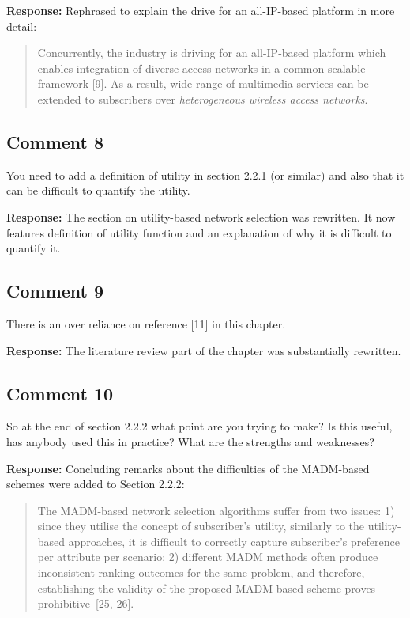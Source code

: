 \documentclass[10pt,a4paper,notitlepage]{article}
\numberwithin{equation}{section}
\begin{document}
\textbf{Response:}
Rephrased to explain the drive for an all-IP-based platform in more detail:
\begin{quote}
Concurrently, the industry is driving for an all-IP-based platform which enables integration of diverse access networks in a common scalable framework [9]. As a result, wide range of multimedia services can be extended to subscribers over \emph{heterogeneous wireless access networks}.
\end{quote}

\subsection{Comment 8}
You need to add a definition of utility in section 2.2.1 (or similar) and also that it can be difficult to quantify the utility.

\textbf{Response:}
The section on utility-based network selection was rewritten. It now features definition of utility function and an explanation of why it is difficult to quantify it.

\subsection{Comment 9}
There is an over reliance on reference [11] in this chapter.

\textbf{Response:}
The literature review part of the chapter was substantially rewritten.

\subsection{Comment 10}
So at the end of section 2.2.2 what point are you trying to make? Is this useful, has anybody used this in practice? What are the strengths and weaknesses?

\textbf{Response:}
Concluding remarks about the difficulties of the MADM-based schemes were added to Section 2.2.2:
\begin{quote}
The MADM-based network selection algorithms suffer from two issues: 1) since they utilise the concept of subscriber's utility, similarly to the utility-based approaches, it is difficult to correctly capture subscriber's preference per attribute per scenario; 2) different MADM methods often produce inconsistent ranking outcomes for the same problem, and therefore, establishing the validity of the proposed MADM-based scheme proves prohibitive~[25, 26].
\end{quote}
\end{document}
